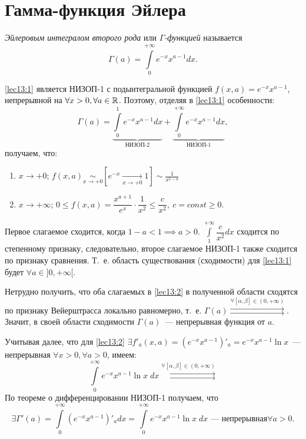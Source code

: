 \documentclass[../../main.tex]{subfiles}
\begin{document}
\section{Гамма-функция Эйлера}

\emph{Эйлеровым интегралом второго рода} или \emph{$\Gamma$-функцией} 
называется
\begin{equation}
\label{lec13:1}
\Gamma(a) = \int\limits_0^{+\infty}e^{-x}x^{a-1}dx.
\end{equation}

\eqref{lec13:1} является НИЗОП-1 с подынтегральной функцией
$f(x, a) = e^{-x}x^{a-1}$, непрерывной на $\forall x > 0, \forall a \in \mathbb{R}$. 
Поэтому, отделяя в \eqref{lec13:1} особенности:
\begin{equation}
	\Gamma(a) = \underbrace{\int\limits_0^1e^{-x}x^{a-1}dx}_{\text{НИЗОП-2}} + 
	\underbrace{\int\limits_0^{+\infty}e^{-x}x^{a-1}dx}_{\text{НИЗОП-1}},
\label{lec13:2} 
\end{equation}
получаем, что:
\begin{enumerate}
\item 
$x \to + 0$; 
$\displaystyle f(x, a) \underset{x \to +0}\sim \left[ e^{-x} 
\underset{x \to +0} \to 1 \right] \sim \frac{1}{x^{1-a}}$
\item
$x \to +\infty$;
$0 \le f(x, a) = \dfrac{x^{a+1}}{e^x} \cdot \dfrac{1}{x^2} \le 
\dfrac{c}{x^2},\ 
c=const \ge 0$.
\end{enumerate}
Первое слагаемое сходится, когда $1 - a < 1 \implies a > 0$.
$\int\limits_1^{+\infty}\dfrac{c}{x^2}dx$ сходится по степенному признаку, 
следовательно, второе слагаемое НИЗОП-1 также сходится по признаку сравнения.
Т.~е. область существования (сходимости) для \eqref{lec13:1} будет $\forall a 
\in ]0, +\infty[$.

Нетрудно получить, что оба слагаемых в \eqref{lec13:2} в полученной области 
сходятся по признаку Вейерштрасса локально равномерно, т.~е.
$\Gamma(a) \overset{\forall \left[ \alpha, \beta \right] \in (0, 
+\infty)}{\rightrightarrows}$.
Значит, в своей области сходимости $\Gamma(a)$~--- непрерывная функция от $a$.

Учитывая далее, что для \eqref{lec13:2}
$\exists f'_a(x, a) = (e^{-x} x^{a-1})'_a = e^{-x}x^{a-1} \ln x$~--- 
непрерывная $\forall x>0,\forall a >0$, имеем:
\[
\int\limits_0^{+\infty} e^{-x} x^{a-1} \ln x\; dx
\overset{\forall \left[ \alpha, \beta \right] \in (0, 
	+\infty)}{\rightrightarrows}
\]
По теореме о дифференцировании НИЗОП-1 получаем, что
\[
\exists \Gamma'(a) = \int\limits_0^{+\infty} (e^{-x} x^{a-1})'_a dx = 
\int\limits_0^{+\infty} e^{-x} x^{a-1} \ln x\; dx 
\text{~--- непрерывная
$\forall a > 0$}.\]
\end{document}
